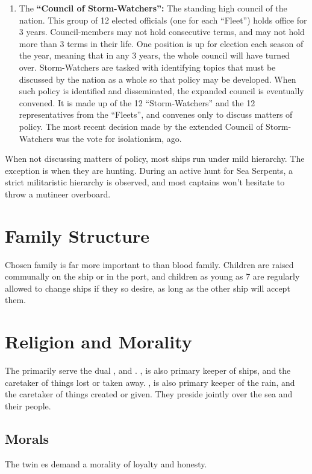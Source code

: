 \documentclass[blue]{GL2020}
\begin{document}
\begin{enumerate}
		\item The {\bf``Council of Storm-Watchers'':} The standing high council of the \pShip{} nation. This group of 12 elected officials (one for each ``Fleet'') holds office for 3 years. Council-members may not hold consecutive terms, and may not hold more than 3 terms in their life. One position is up for election each season of the year, meaning that in any 3 years, the whole council will have turned over. Storm-Watchers are tasked with identifying topics that must be discussed by the nation as a whole so that policy may be developed. When such policy is identified and disseminated, the expanded council is eventually convened. It is made up of the 12 ``Storm-Watchers'' and the 12 representatives from the ``Fleets'', and convenes only to discuss matters of policy. The most recent decision made by the extended Council of Storm-Watchers was the vote for isolationism, \pIsolation{} ago.
\end{enumerate}

When not discussing matters of policy, most ships run under mild hierarchy. The exception is when they are hunting. During an active hunt for Sea Serpents, a strict militaristic hierarchy is observed, and most captains won't hesitate to throw a mutineer overboard.

\section*{Family Structure}
Chosen family is far more important to \pShippies{} than blood family. Children are raised communally on the ship or in the port, and children as young as 7 are regularly allowed to change ships if they so desire, as long as the other ship will accept them.

\section*{Religion and Morality}
The \pShippies{} primarily serve the dual \cEbb{\God}, \cEbb{} and \cFlow{}. \cEbbFull{\MYname}, is also primary keeper of ships, and the caretaker of things lost or taken away. \cFlowFull{\MYname}, is also primary keeper of the rain, and the caretaker of things created or given. They preside jointly over the sea and their people.


\subsection*{Morals}
The twin \cEbb{\God}es demand a morality of loyalty and honesty.
\end{document}
